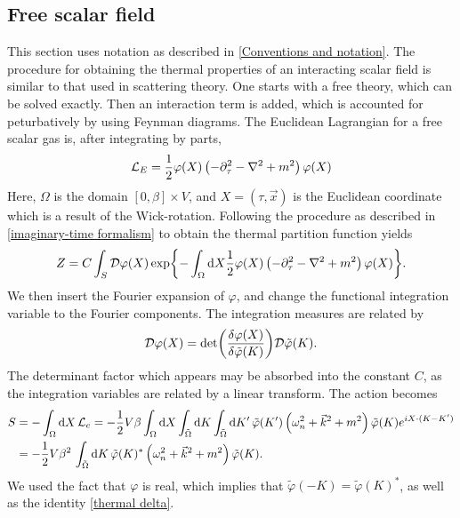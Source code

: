 \subsection*{Free scalar field}

This section uses notation as described in \autoref{Conventions and notation}.
The procedure for obtaining the thermal properties of an interacting scalar field is similar to that used in scattering theory.
One starts with a free theory, which can be solved exactly.
Then an interaction term is added, which is accounted for peturbatively by using Feynman diagrams.
The Euclidean Lagrangian for a free scalar gas is, after integrating by parts,
\begin{equation*}
    \mathcal{L}_E = \frac{1}{2} \varphi(X) \left( -\partial_\tau^2 - \nabla^2 + m^2 \right) \varphi(X)
\end{equation*}
Here, $\Omega$ is the domain $[0, \beta] \times V$, and $X = (\tau, \vec x)$ is the Euclidean coordinate which is a result of the Wick-rotation.
Following the procedure as described in \autoref{imaginary-time formalism} to obtain the thermal partition function yields
\begin{equation*}
    Z = C \int_S \mathcal{D} \varphi(X) 
    \exp{
        - \int_\Omega \dd X \frac{1}{2} 
        \varphi(X) \left( -\partial_\tau^2 - \nabla^2 + m^2 \right) \varphi(X)
    }.
\end{equation*}
We then insert the Fourier expansion of $\varphi$, and change the functional integration variable to the Fourier components.
The integration measures are related by
\begin{equation*}
    \mathcal{D} \varphi(X) = \det(\frac{\delta \varphi(X)}{\delta \tilde \varphi(K)}) \mathcal{D}\tilde \varphi(K).
\end{equation*}
The determinant factor which appears may be absorbed into the constant $C$, as the integration variables are related by a linear transform.
The action becomes 
\begin{align*}
    S & = - \int_\Omega \dd X\, \mathcal{L}_e 
    = - \frac{1}{2} V \beta \int_\Omega \dd X \int_{\tilde \Omega} \dd K \int_{\tilde \Omega} \dd K' \,
    \tilde \varphi(K') 
    \left(
        \omega_n^2 + \vec k^2 + m^2
    \right)
    \tilde \varphi(K)
    e^{iX\cdot(K - K')} \\
    & = - \frac{1}{2} V \beta^2 \, \int_{\tilde \Omega} \dd K \,
    \tilde \varphi(K)^*
    \left(
        \omega_n^2 + \vec k^2 + m^2
    \right)
    \tilde \varphi(K).
\end{align*}
We used the fact that $\varphi$ is real, which implies that $\tilde \varphi(-K) = \tilde \varphi(K)^*$, as well as the identity \autoref{thermal delta}.
